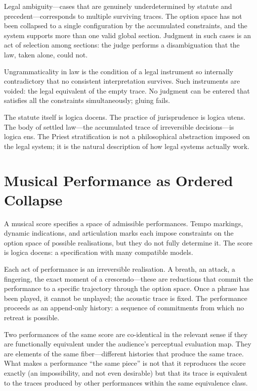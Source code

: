\documentclass[12pt, oneside]{amsbook}
\theoremstyle{plain}
\theoremstyle{definition}
\theoremstyle{remark}
\begin{document}
Legal ambiguity---cases that are genuinely underdetermined by statute and
precedent---corresponds to multiple surviving traces. The option space has not
been collapsed to a single configuration by the accumulated constraints, and
the system supports more than one valid global section. Judgment in such cases
is an act of selection among sections: the judge performs a disambiguation
that the law, taken alone, could not.

Ungrammaticality in law is the condition of a legal instrument so internally
contradictory that no consistent interpretation survives. Such instruments are
voided: the legal equivalent of the empty trace. No judgment can be entered
that satisfies all the constraints simultaneously; gluing fails.

The statute itself is logica docens. The practice of jurisprudence is logica
utens. The body of settled law---the accumulated trace of irreversible
decisions---is logica ens. The Priest stratification is not a philosophical
abstraction imposed on the legal system; it is the natural description of
how legal systems actually work.

\section{Musical Performance as Ordered Collapse}

A musical score specifies a space of admissible performances. Tempo markings,
dynamic indications, and articulation marks each impose constraints on the
option space of possible realisations, but they do not fully determine it.
The score is logica docens: a specification with many compatible models.

Each act of performance is an irreversible realisation. A breath, an attack, a
fingering, the exact moment of a crescendo---these are reductions that commit
the performance to a specific trajectory through the option space. Once a
phrase has been played, it cannot be unplayed; the acoustic trace is fixed.
The performance proceeds as an append-only history: a sequence of commitments
from which no retreat is possible.

Two performances of the same score are co-identical in the relevant sense if
they are functionally equivalent under the audience's perceptual evaluation
map. They are elements of the same fiber---different histories that produce
the same trace. What makes a performance ``the same piece'' is not that it
reproduces the score exactly (an impossibility, and not even desirable) but
that its trace is equivalent to the traces produced by other performances
within the same equivalence class.
\end{document}

